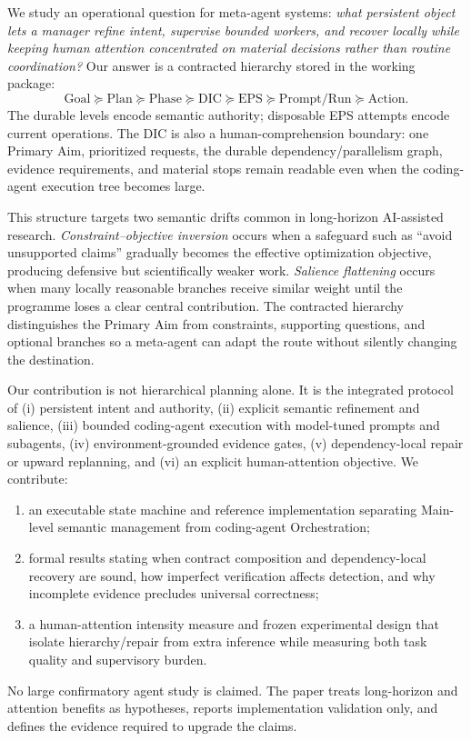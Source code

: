 \documentclass{article}
\begin{document}
We study an operational question for meta-agent systems: \emph{what persistent object lets a manager refine intent, supervise bounded workers, and recover locally while keeping human attention concentrated on material decisions rather than routine coordination?} Our answer is a contracted hierarchy stored in the working package:
\[
\text{Goal}\succeq\text{Plan}\succeq\text{Phase}\succeq\text{DIC}\succeq\text{EPS}\succeq\text{Prompt/Run}\succeq\text{Action}.
\]
The durable levels encode semantic authority; disposable EPS attempts encode current operations. The DIC is also a human-comprehension boundary: one Primary Aim, prioritized requests, the durable dependency/parallelism graph, evidence requirements, and material stops remain readable even when the coding-agent execution tree becomes large.

This structure targets two semantic drifts common in long-horizon AI-assisted research. \emph{Constraint--objective inversion} occurs when a safeguard such as ``avoid unsupported claims'' gradually becomes the effective optimization objective, producing defensive but scientifically weaker work. \emph{Salience flattening} occurs when many locally reasonable branches receive similar weight until the programme loses a clear central contribution. The contracted hierarchy distinguishes the Primary Aim from constraints, supporting questions, and optional branches so a meta-agent can adapt the route without silently changing the destination.

Our contribution is not hierarchical planning alone. It is the integrated protocol of (i) persistent intent and authority, (ii) explicit semantic refinement and salience, (iii) bounded coding-agent execution with model-tuned prompts and subagents, (iv) environment-grounded evidence gates, (v) dependency-local repair or upward replanning, and (vi) an explicit human-attention objective. We contribute:
\begin{enumerate}
\item an executable state machine and reference implementation separating Main-level semantic management from coding-agent Orchestration;
\item formal results stating when contract composition and dependency-local recovery are sound, how imperfect verification affects detection, and why incomplete evidence precludes universal correctness;
\item a human-attention intensity measure and frozen experimental design that isolate hierarchy/repair from extra inference while measuring both task quality and supervisory burden.
\end{enumerate}
No large confirmatory agent study is claimed. The paper treats long-horizon and attention benefits as hypotheses, reports implementation validation only, and defines the evidence required to upgrade the claims.
\end{document}
